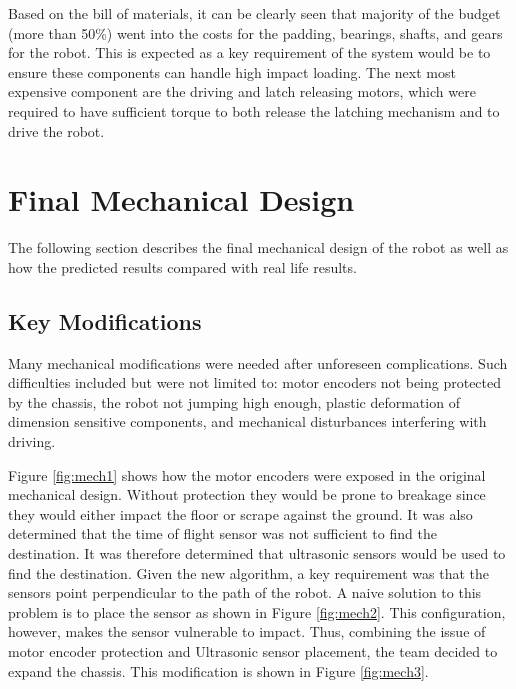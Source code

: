 \documentclass[ece]{uw-wkrpt}
\let\oldsection\section
\renewcommand\section{\clearpage\oldsection}
\begin{document}
Based on the bill of materials, it can be clearly seen that majority of the budget (more than 50\%) went into the costs for the padding, bearings, shafts, and gears for the robot. This is expected as a key requirement of the system would be to ensure these components can handle high impact loading. The next most expensive component are the driving and latch releasing motors, which were required to have sufficient torque to both release the latching mechanism and to drive the robot. 

\section{Final Mechanical Design} \label{mech}

The following section describes the final mechanical design of the robot as well as how the predicted results compared with real life results.

\subsection{Key Modifications}

Many mechanical modifications were needed after unforeseen complications. Such difficulties included but were not limited to: motor encoders not being protected by the chassis, the robot not jumping high enough, plastic deformation of dimension sensitive components, and mechanical disturbances interfering with driving.  

Figure \ref{fig:mech1} shows how the motor encoders were exposed in the original mechanical design. Without protection they would be prone to breakage since they would either impact the floor or scrape against the ground. It was also determined that the time of flight sensor was not sufficient to find the destination. It was therefore determined that ultrasonic sensors would be used to find the destination. Given the new algorithm, a key requirement was that the sensors point perpendicular to the path of the robot. A naive solution to this problem is to place the sensor as shown in Figure \ref{fig:mech2}. This configuration, however, makes the sensor vulnerable to impact. Thus, combining the issue of motor encoder protection and Ultrasonic sensor placement, the team decided to expand the chassis. This modification is shown in Figure \ref{fig:mech3}. 
\end{document}
